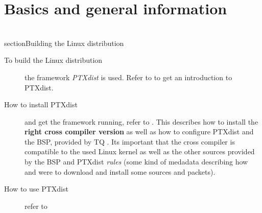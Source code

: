 \chapter{Basics and general information}%
\label{cha:Basics and general information}

\\section{Building the Linux distribution}%
\label{sec:Building the Linux distribution}

\begin{description}
    \item[To build the Linux distribution] the framework \textit{PTXdist} is
        used. Refer to \cite{PTXdist} to get an introduction to PTXdist.
    \item[How to install PTXdist] and get the framework running, refer to
        \cite{install_ptxdist}. This describes how to install the
        \textbf{right cross compiler version} as well as how to configure
        PTXdist and the BSP, provided by TQ \cite[TQ BSP]{BSP_119}. Its
        important that the cross compiler is compatible to the used Linux kernel
        as well as the other sources provided by the BSP and PTXdist
        \textit{rules} (some kind of medadata describing how and were to
        download and install some sources and packets).
    \item[How to use PTXdist] refer to \cite[PTXdist manual]{ptxdist_manual}
\end{description}
\\
